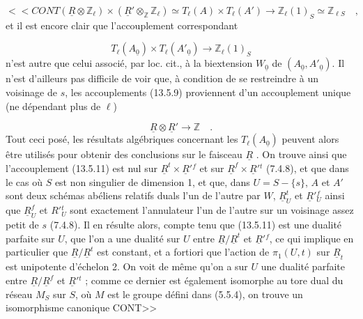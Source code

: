 
\begin{equation}\tag{13.5.9}
<<CONT (\underline{R}\otimes\mathbb{Z}_\ell) \times (\underline{R}'\otimes_{\mathbb{Z}}\mathbb{Z}_\ell) \simeq T_\ell(A) \times T_\ell(A') \to \mathbb{Z}_\ell(1)_S \simeq \mathbb{Z}_{\ell S} \quad ,
\end{equation}
et il est encore clair que l'accouplement correspondant

\begin{equation}\tag{13.5.10}
T_\ell(A_{\underline{0}}) \times T_\ell(A'_{\underline{0}}) \longrightarrow \mathbb{Z}_\ell(1)_S
\end{equation}
n'est autre que celui associé, par loc. cit., à la biextension $W_{\underline{0}}$ de $(A_{\underline{0}},A'_{\underline{0}})$. Il n'est d'ailleurs pas difficile de voir que, à condition de se restreindre à un voisinage de $s$, les accouplements (13.5.9) proviennent d'un accouplement unique (ne dépendant plus de $\ell$)

\begin{equation}\tag{13.5.11}
\underline{R} \otimes \underline{R}' \longrightarrow \mathbb{Z} \quad .
\end{equation}
Tout ceci posé, les résultats algébriques concernant les $T_\ell(A_{\underline{0}})$ peuvent alors être utilisés pour obtenir des conclusions sur le faisceau $\underline{R}$ . On trouve ainsi que l'accouplement (13.5.11) est nul sur $\underline{R}^{t} \times \underline{R}'{}^{f}$ et sur $\underline{R}^{f} \times \underline{R}'{}^{t}$ (7.4.8), et que dans le cas où $S$ est non singulier de dimension 1, et que, dans $U = S-\{s\}$, $A$ et $A'$ sont deux schémas abéliens relatifs duals l'un de l'autre par $W$, $\underline{R}^{t}_{U}$ et $\underline{R}'{}^{f}_{U}$ ainsi que $\underline{R}^{f}_{U}$ et $R'{}^{t}_{U}$ sont exactement l'annulateur l'un de l'autre sur un voisinage assez petit de $s$ (7.4.8). Il en résulte alors, compte tenu que (13.5.11) est une dualité parfaite sur $U$, que l'on a une dualité sur $U$ entre $\underline{R}/\underline{R}^{t}$ et $\underline{R}'{}^{f}$, ce qui implique en particulier que $\underline{R}/\underline{R}^{t}$ est constant, et a fortiori que l'action de $\pi_1(U,t)$ sur $\underline{R}_t$ est unipotente d'échelon 2. On voit de même qu'on a sur $U$ une dualité parfaite entre $\underline{R}/\underline{R}^{f}$ et $\underline{R}'{}^{t}$ ; comme ce dernier est également isomorphe au tore dual du réseau $M_S$ sur $S$, où $M$ est le groupe défini dans (5.5.4), on trouve un isomorphisme canonique CONT>>


